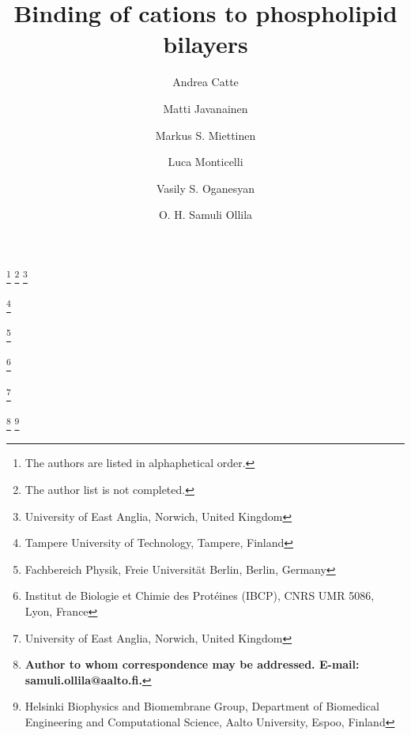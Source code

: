 \documentclass[pre,aps,floatfix,authordate1-4,twocolumn]{revtex4-1}
\begin{document}

\title{Binding of cations to phospholipid bilayers}

\author{Andrea Catte}
\thanks{The authors are listed in alphaphetical order.}
\thanks{The author list is not completed.}
\thanks{University of East Anglia, Norwich, United Kingdom}
\author{Matti Javanainen}
\thanks{Tampere University of Technology, Tampere, Finland}
\author{Markus S. Miettinen}
\thanks{Fachbereich Physik, Freie Universit\"at Berlin, Berlin, Germany}
\author{Luca Monticelli}
\thanks{Institut de Biologie et Chimie des Prot{\'e}ines (IBCP), CNRS UMR 5086, Lyon, France}
\author{Vasily S. Oganesyan}
\thanks{University of East Anglia, Norwich, United Kingdom}
\author{O. H. Samuli Ollila} 
\thanks{{\bf Author to whom correspondence may be addressed. E-mail: samuli.ollila@aalto.fi.}}
\thanks{Helsinki Biophysics and Biomembrane Group, Department of Biomedical Engineering and Computational Science, Aalto University, Espoo, Finland}
\end{document}
